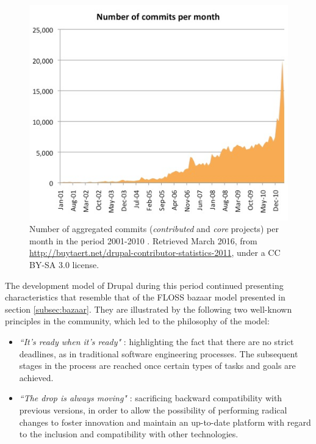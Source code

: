 \begin{figure}[H]
	\centering
	\includegraphics[scale=0.6]{graphs/aggregated_commits_per_month}
	\caption[Number of aggregated commits (2001-2010)]%
    {Number of aggregated commits (\textit{contributed} and \textit{core} projects) per month in the period 2001-2010 \parencite{dries-contrib-stats:2016:Online}. Retrieved  March 2016, from \url{http://buytaert.net/drupal-contributor-statistics-2011}, under a CC BY-SA 3.0 license.}
	\label{aggregated-commits-month}
\end{figure}

The development model of Drupal during this period continued presenting characteristics that resemble that of the FLOSS bazaar model presented in section \ref{subsec:bazaar}. They are illustrated by the following two well-known principles in the community, which led to the philosophy of the model: 

\begin{itemize}
	\item \textit{``It's ready when it's ready"} \parencite{drupal-ready-ready:2013:Online}: highlighting the fact that there are no strict deadlines, as in traditional software engineering processes. The subsequent stages in the process are reached once certain types of tasks and goals are achieved.
	\item \textit{``The drop is always moving"}  \parencite{drupal-drop-moving:2014:Online}: sacrificing backward compatibility with previous versions, in order to allow the possibility of performing radical changes to foster innovation and maintain an up-to-date platform with regard to the inclusion and compatibility with other technologies.
\end{itemize}

